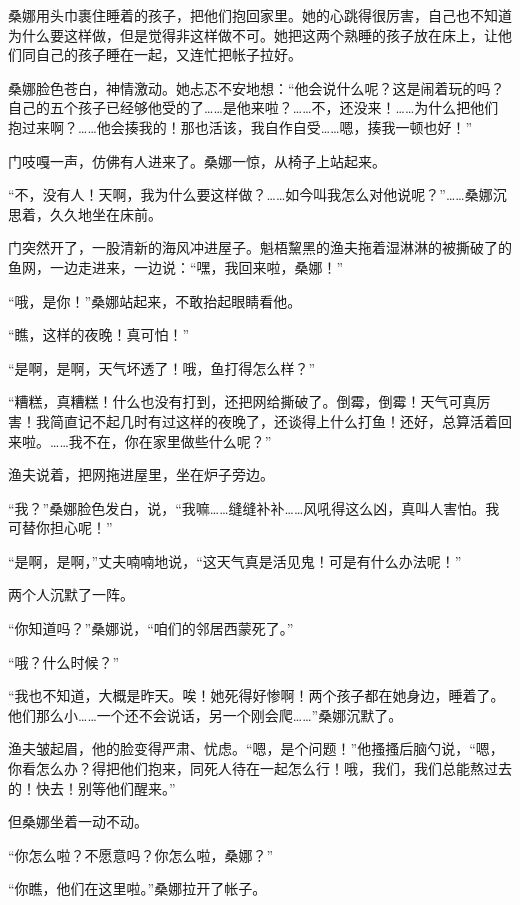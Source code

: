 \documentclass[12pt,UTF-8,openany]{ctexbook}
\begin{document}
\begin{large}
    桑娜用头巾裹住睡着的孩子，把他们抱回家里。她的心跳得很厉害，自己也不知道为什么要这样做，但是觉得非这样做不可。她把这两个熟睡的孩子放在床上，让他们同自己的孩子睡在一起，又连忙把帐子拉好。
    
    桑娜脸色苍白，神情激动。她忐忑不安地想：“他会说什么呢？这是闹着玩的吗？自己的五个孩子已经够他受的了……是他来啦？……不，还没来！……为什么把他们抱过来啊？……他会揍我的！那也活该，我自作自受……嗯，揍我一顿也好！”
    
    门吱嘎一声，仿佛有人进来了。桑娜一惊，从椅子上站起来。
    
    “不，没有人！天啊，我为什么要这样做？……如今叫我怎么对他说呢？”……桑娜沉思着，久久地坐在床前。
    
    门突然开了，一股清新的海风冲进屋子。魁梧黧黑的渔夫拖着湿淋淋的被撕破了的鱼网，一边走进来，一边说：“嘿，我回来啦，桑娜！”
    
    “哦，是你！”桑娜站起来，不敢抬起眼睛看他。
    
    “瞧，这样的夜晚！真可怕！”
    
    “是啊，是啊，天气坏透了！哦，鱼打得怎么样？”
    
    “糟糕，真糟糕！什么也没有打到，还把网给撕破了。倒霉，倒霉！天气可真厉害！我简直记不起几时有过这样的夜晚了，还谈得上什么打鱼！还好，总算活着回来啦。……我不在，你在家里做些什么呢？”
    
    渔夫说着，把网拖进屋里，坐在炉子旁边。
    
    “我？”桑娜脸色发白，说，“我嘛……缝缝补补……风吼得这么凶，真叫人害怕。我可替你担心呢！”
    
    “是啊，是啊，”丈夫喃喃地说，“这天气真是活见鬼！可是有什么办法呢！”
    
    两个人沉默了一阵。
    
    “你知道吗？”桑娜说，“咱们的邻居西蒙死了。”
    
    “哦？什么时候？”
    
    “我也不知道，大概是昨天。唉！她死得好惨啊！两个孩子都在她身边，睡着了。他们那么小……一个还不会说话，另一个刚会爬……”桑娜沉默了。
    
    渔夫皱起眉，他的脸变得严肃、忧虑。“嗯，是个问题！”他搔搔后脑勺说，“嗯，你看怎么办？得把他们抱来，同死人待在一起怎么行！哦，我们，我们总能熬过去的！快去！别等他们醒来。”
    
    但桑娜坐着一动不动。
    
    “你怎么啦？不愿意吗？你怎么啦，桑娜？”
    
    “你瞧，他们在这里啦。”桑娜拉开了帐子。
    
\end{large}
\end{document}
